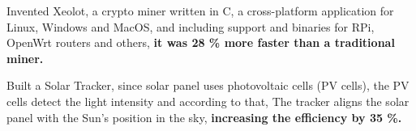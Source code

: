 \documentclass[a4paper]{deedy-resume} %
\begin{document}
\begin{minipage}[t]{0.66\textwidth}
\sectionspace %


Invented Xeolot, a crypto miner written in C, a cross-platform application for Linux, Windows and MacOS, and including support and binaries for RPi, OpenWrt routers and others, \textbf{it was 28 \% more faster than a traditional miner.} \\

\sectionspace %





Built a Solar Tracker, since solar panel uses photovoltaic cells (PV cells), the PV cells detect the light intensity and according to that, The tracker aligns the solar panel with the Sun's position in the sky, \textbf{increasing the efficiency by 35 \%. }\\

\sectionspace %




\end{minipage} %
\end{document}
